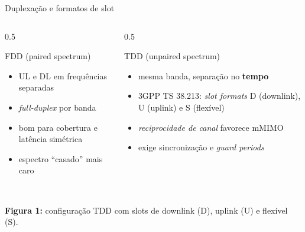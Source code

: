 \documentclass[aspectratio=169,11pt]{beamer}
\begin{document}
\begin{frame}{Duplexação e formatos de slot}
  \begin{columns}
    \begin{column}{0.5\textwidth}
      \begin{block}{FDD (paired spectrum)}
        \begin{itemize}
          \item UL e DL em frequências separadas
          \item \emph{full-duplex} por banda
          \item bom para cobertura e latência simétrica
          \item espectro ``casado'' mais caro
        \end{itemize}
      \end{block}
    \end{column}
    \begin{column}{0.5\textwidth}
      \begin{alertblock}{TDD (unpaired spectrum)}
        \begin{itemize}
          \item mesma banda, separação no \textbf{tempo}
          \item 3GPP TS 38.213: \emph{slot formats} D (downlink), U (uplink) e S (flexível)
          \item \emph{reciprocidade de canal} favorece mMIMO
          \item exige sincronização e \emph{guard periods}
        \end{itemize}
      \end{alertblock}
    \end{column}
  \end{columns}
  \begin{center}
    \\[1mm]
    {\scriptsize \textbf{Figura 1:} configuração TDD com slots de downlink (D), uplink (U) e flexível (S).}
  \end{center}
\end{frame}
\end{document}
